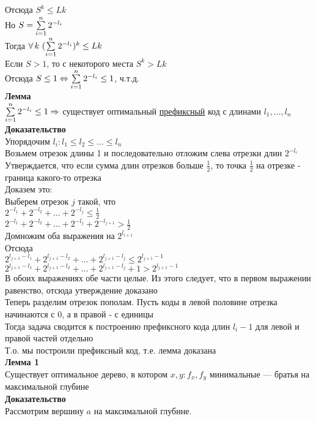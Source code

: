 \documentclass[12pt]{article}
\begin{document}
Отсюда $S^k \leq Lk$\\
Но $S = \sum\limits_{i=1}^n 2^{-l_i}$\\
Тогда $\forall\,k\ (\sum\limits_{i=1}^n 2^{-l_i})^k \leq Lk$\\
Если $S > 1$, то с некоторого места $S^k > Lk$\\
Отсюда $S \leq 1 \Leftrightarrow \sum\limits_{i=1}^n 2^{-l_i} \leq 1$, ч.т.д.\\
\textbf{Лемма}\\
$\sum\limits_{i=1}^n 2^{-l_i} \leq 1\Rightarrow$ существует оптимальный \underline{префиксный} код с длинами $l_1,\ldots,l_n$\\
\textbf{Доказательство}\\
Упорядочим $l_i: l_1 \leq l_2 \leq \ldots \leq l_n$\\
Возьмем отрезок длины 1 и последовательно отложим слева отрезки длин $2^{-l_i}$\\
Утверждается, что если сумма длин отрезков больше $\frac12$, то точка $\frac12$ на отрезке - граница какого-то отрезка\\
Доказем это:\\
Выберем отрезок $j$ такой, что\\
$2^{-l_1}+2^{-l_2}+\ldots+2^{-l_j} \leq \frac12$\\
$2^{-l_1}+2^{-l_2}+\ldots+2^{-l_j}+2^{-l_{j+1}} > \frac12$\\
Домножим оба выражения на $2^{l_{i+1}}$\\
Отсюда\\
$2^{l_{j+1}-l_1}+2^{l_{j+1}-l_2}+\ldots+2^{l_{j+1}-l_j} \leq 2^{l_{j+1}-1}$\\
$2^{l_{j+1}-l_1}+2^{l_{j+1}-l_2}+\ldots+2^{l_{j+1}-l_j}+1>2^{l_{j+1}-1}$\\
В обоих выражениях обе части целые. Из этого следует, что в первом выражении равенство, отсюда утверждение доказано\\
Теперь разделим отрезок пополам. Пусть коды в левой половине отрезка начинаются с 0, а в правой - с единицы\\
Тогда задача сводится к построению префиксного кода длин $l_i-1$ для левой и правой частей отдельно\\
Т.о. мы построили префиксный код, т.е. лемма доказана\\
\textbf{Лемма 1}\\
Существует оптимальное дерево, в котором $x,y: f_x,f_y$ минимальные --- братья на максимальной глубине\\
\textbf{Доказательство}\\
Рассмотрим вершину $a$ на максимальной глубине. 
\end{document}
